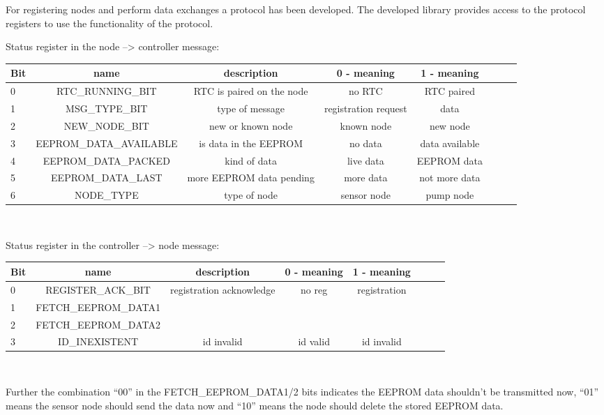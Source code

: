 For registering nodes and perform data exchanges a protocol has been developed. The developed library provides access to the protocol registers to use the functionality of the protocol.


Status register in the node --> controller message:

\begin{table}[htbp]
        \small
        \setlength\tabcolsep{2pt}
\begin{tabular}{ l c c c c c c r }
  Bit & name & description & 0 - meaning & 1 - meaning\\ \hline
  0 & RTC\_RUNNING\_BIT & RTC is paired on the node & no RTC & RTC paired \\ \hline
  1 & MSG\_TYPE\_BIT & type of message & registration request & data \\ \hline
  2 & NEW\_NODE\_BIT & new or known node & known node & new node \\ \hline
  3 & EEPROM\_DATA\_AVAILABLE & is data in the EEPROM & no data & data available\\ \hline
  4 & EEPROM\_DATA\_PACKED & kind of data & live data & EEPROM data\\ \hline
  5 & EEPROM\_DATA\_LAST & more EEPROM data pending & more data & not more data \\ \hline
  6 & NODE\_TYPE & type of node & sensor node & pump node\\ \hline
\end{tabular}\\
\end{table}


Status register in the controller --> node message:


\begin{table}[htbp]
        \small
        \setlength\tabcolsep{2pt}
\begin{tabular}{ l c c c c c c r }
  Bit & name & description & 0 - meaning & 1 - meaning\\ \hline
  0 & REGISTER\_ACK\_BIT & registration acknowledge & no reg & registration\\ \hline
  1 & FETCH\_EEPROM\_DATA1 & &  &  \\ \hline
  2 & FETCH\_EEPROM\_DATA2 &  & &  \\ \hline
  3 & ID\_INEXISTENT & id invalid & id valid & id invalid\\ \hline
\end{tabular}\\
\end{table}

Further the combination ``00'' in the FETCH\_EEPROM\_DATA1/2 bits indicates the EEPROM data shouldn't be transmitted now, ``01'' means the sensor node should send the data now and ``10'' means the node should delete the stored EEPROM data.